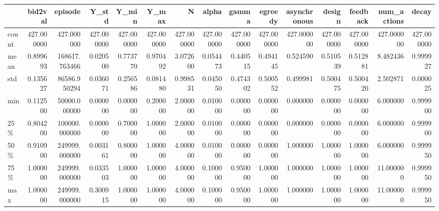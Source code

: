 \begin{tabular}{lrrrrrrrrrrrrrr}
\toprule
{} &     bid2val &        episode &       Y\_std &       Y\_min &       Y\_max &           N &       alpha &       gamma &     egreedy &  asynchronous &      design &    feedback &  num\_actions &       decay \\
\midrule
count &  427.000000 &     427.000000 &  427.000000 &  427.000000 &  427.000000 &  427.000000 &  427.000000 &  427.000000 &  427.000000 &    427.000000 &  427.000000 &  427.000000 &   427.000000 &  427.000000 \\
mean  &    0.899693 &  168617.763466 &    0.020500 &    0.773770 &    0.970492 &    3.072600 &    0.054473 &    0.440515 &    0.494145 &      0.524590 &    0.510539 &    0.512881 &     8.482436 &    0.999927 \\
std   &    0.135627 &   86586.950294 &    0.036071 &    0.256586 &    0.081480 &    0.998531 &    0.045050 &    0.474302 &    0.500552 &      0.499981 &    0.500475 &    0.500420 &     2.502871 &    0.000025 \\
min   &    0.112500 &   50000.000000 &    0.000000 &    0.000000 &    0.200000 &    2.000000 &    0.010000 &    0.000000 &    0.000000 &      0.000000 &    0.000000 &    0.000000 &     6.000000 &    0.999900 \\
25\%   &    0.804200 &  100000.000000 &    0.000000 &    0.700000 &    1.000000 &    2.000000 &    0.010000 &    0.000000 &    0.000000 &      0.000000 &    0.000000 &    0.000000 &     6.000000 &    0.999900 \\
50\%   &    0.910900 &  249999.000000 &    0.003161 &    0.800000 &    1.000000 &    4.000000 &    0.010000 &    0.000000 &    0.000000 &      1.000000 &    1.000000 &    1.000000 &     6.000000 &    0.999950 \\
75\%   &    1.000000 &  249999.000000 &    0.033503 &    1.000000 &    1.000000 &    4.000000 &    0.100000 &    0.950000 &    1.000000 &      1.000000 &    1.000000 &    1.000000 &    11.000000 &    0.999950 \\
max   &    1.000000 &  249999.000000 &    0.300915 &    1.000000 &    1.000000 &    4.000000 &    0.100000 &    0.950000 &    1.000000 &      1.000000 &    1.000000 &    1.000000 &    11.000000 &    0.999950 \\
\bottomrule
\end{tabular}
